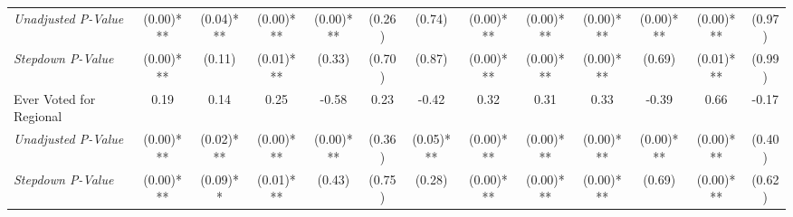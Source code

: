 \begin{tabular}{l c c c c c c c c c c c c}
\quad \textit{Unadjusted P-Value} & (0.00)*** & (0.04)*** & (0.00)*** & (0.00)*** & (0.26) & (0.74) & (0.00)*** & (0.00)*** & (0.00)*** & (0.00)*** & (0.00)*** & (0.97) \\
\quad \textit{Stepdown P-Value} & (0.00)*** & (0.11) & (0.01)*** & (0.33) & (0.70) & (0.87) & (0.00)*** & (0.00)*** & (0.00)*** & (0.69) & (0.01)*** & (0.99) \\
Ever Voted for Regional & 0.19 & 0.14 & 0.25 & -0.58 & 0.23 & -0.42 & 0.32 & 0.31 & 0.33 & -0.39 & 0.66 & -0.17 \\
\quad \textit{Unadjusted P-Value} & (0.00)*** & (0.02)*** & (0.00)*** & (0.00)*** & (0.36) & (0.05)*** & (0.00)*** & (0.00)*** & (0.00)*** & (0.00)*** & (0.00)*** & (0.40) \\
\quad \textit{Stepdown P-Value} & (0.00)*** & (0.09)** & (0.01)*** & (0.43) & (0.75) & (0.28) & (0.00)*** & (0.00)*** & (0.00)*** & (0.69) & (0.00)*** & (0.62) \\
\bottomrule
\end{tabular}
